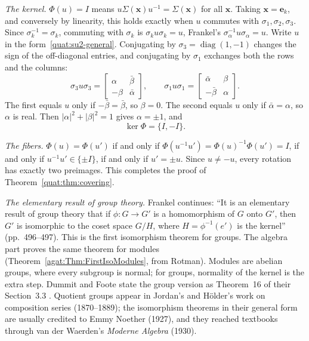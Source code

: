 \emph{The kernel.} $\Phi(u)=I$ means $u\Sigma(\mathbf x)u^{-1}=\Sigma(\mathbf x)$
for all $\mathbf x$. Taking $\mathbf x=\mathbf e_k$, and conversely by
linearity, this holds exactly when $u$ commutes with $\sigma_1,\sigma_2,\sigma_3$.
Since $\sigma_k^{-1}=\sigma_k$, commuting with $\sigma_k$ is
$\sigma_ku\sigma_k=u$, Frankel's $\sigma_\alpha^{-1}u\sigma_\alpha=u$. Write $u$
in the form~\eqref{quat:su2-general}. Conjugating by
$\sigma_3=\operatorname{diag}(1,-1)$ changes the sign of the off-diagonal
entries, and conjugating by $\sigma_1$ exchanges both the rows and the
columns:
\begin{equation}
 \sigma_3u\sigma_3=\begin{bmatrix}\alpha&\bar\beta\\-\beta&\bar\alpha\end{bmatrix},
 \qquad
 \sigma_1u\sigma_1=\begin{bmatrix}\bar\alpha&\beta\\-\bar\beta&\alpha\end{bmatrix}.
\end{equation}
The first equals $u$ only if $-\bar\beta=\bar\beta$, so $\beta=0$. The
second equals $u$ only if $\bar\alpha=\alpha$, so $\alpha$ is real. Then
$|\alpha|^2+|\beta|^2=1$ gives $\alpha=\pm1$, and
\begin{equation}
 \ker\Phi=\{I,-I\}.
\end{equation}

\emph{The fibers.} $\Phi(u)=\Phi(u')$ if and only if
$\Phi(u^{-1}u')=\Phi(u)^{-1}\Phi(u')=I$, if and only if
$u^{-1}u'\in\{\pm I\}$, if and only if $u'=\pm u$. Since $u\ne-u$, every
rotation has exactly two preimages. This completes the proof of
Theorem~\ref{quat:thm:covering}.

\emph{The elementary result of group theory.} Frankel continues: ``It is an
elementary result of group theory that if $\phi\colon G\to G'$ is a
homomorphism of $G$ onto $G'$, then $G'$ is isomorphic to the coset space
$G/H$, where $H=\phi^{-1}(e')$ is the kernel'' (pp.~496--497). This is the first
isomorphism theorem for groups. The algebra part proves the same theorem for
modules (Theorem~\ref{agat:Thm:FirstIsoModules}, from Rotman). Modules are
abelian groups, where every subgroup is normal; for groups, normality of the
kernel is the extra step. Dummit and Foote state the group version as
Theorem~16 of their Section~3.3 \cite{agat:DuFo2003}. Quotient groups appear
in Jordan's and H\"older's work on composition series (1870--1889); the
isomorphism theorems in their general form are usually credited to Emmy
Noether (1927), and they reached textbooks through van der Waerden's
\emph{Moderne Algebra} (1930).

